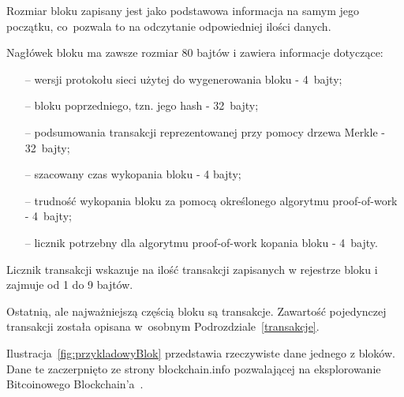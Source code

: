 \documentclass[12pt, oneside, final, openany]{mgr}
\begin{document}
\indent Rozmiar bloku zapisany jest jako podstawowa informacja na samym jego początku, co~pozwala to na odczytanie odpowiedniej ilości danych. 

\indent Nagłówek bloku ma zawsze rozmiar 80 bajtów i zawiera informacje dotyczące:
\begin{itemize}
\item[--] wersji protokołu sieci użytej do wygenerowania bloku - 4~bajty;
\item[--] bloku poprzedniego, tzn. jego hash - 32~bajty;
\item[--] podsumowania transakcji reprezentowanej przy pomocy drzewa Merkle - 32~bajty;
\item[--] szacowany czas wykopania bloku - 4 bajty;
\item[--] trudność wykopania bloku za pomocą określonego algorytmu proof-of-work - 4~bajty;
\item[--] licznik potrzebny dla algorytmu proof-of-work kopania bloku - 4~bajty.
\end{itemize} 

\indent Licznik transakcji wskazuje na ilość transakcji zapisanych w rejestrze bloku i zajmuje od 1 do 9 bajtów.

\indent Ostatnią, ale najważniejszą częścią bloku są transakcje. Zawartość pojedynczej transakcji została opisana w~osobnym Podrozdziale~\ref{transakcje}.

\indent Ilustracja~\ref{fig:przykladowyBlok} przedstawia rzeczywiste dane jednego z bloków. Dane te zaczerpnięto ze strony blockchain.info pozwalającej na eksplorowanie Bitcoinowego Blockchain'a~\cite{blockchaininfo}.
\end{document}
